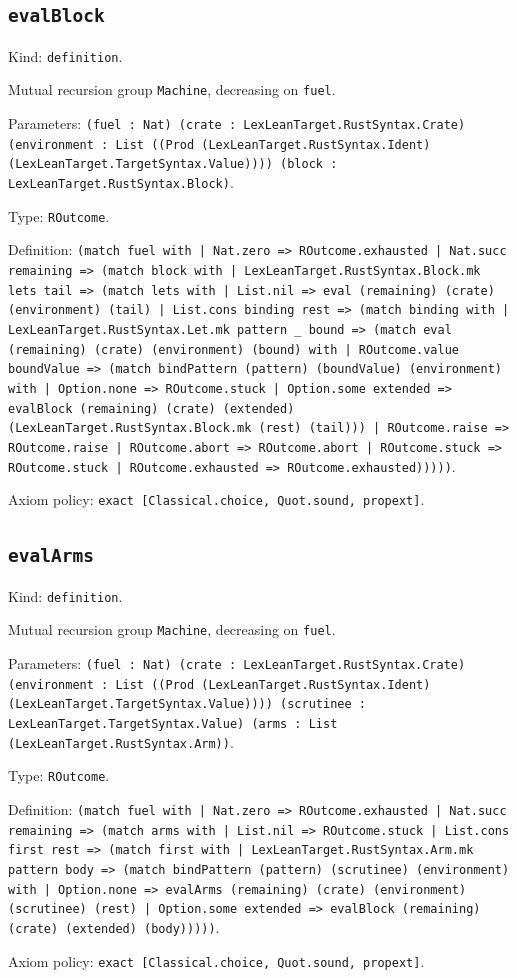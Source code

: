 \documentclass[11pt]{article}
\begin{document}
\subsection*{\texttt{evalBlock}}
\noindent Kind: \texttt{definition}.\par
\noindent Mutual recursion group \texttt{Machine}, decreasing on \texttt{fuel}.\par
\noindent Parameters: \texttt{(fuel : Nat) (crate : LexLeanTarget.RustSyntax.Crate) (environment : List ((Prod (LexLeanTarget.RustSyntax.Ident) (LexLeanTarget.TargetSyntax.Value)))) (block : LexLeanTarget.RustSyntax.Block)}.\par
\noindent Type: \texttt{ROutcome}.\par
\noindent Definition: \texttt{(match fuel with | Nat.zero => ROutcome.exhausted | Nat.succ remaining => (match block with | LexLeanTarget.RustSyntax.Block.mk lets tail => (match lets with | List.nil => eval (remaining) (crate) (environment) (tail) | List.cons binding rest => (match binding with | LexLeanTarget.RustSyntax.Let.mk pattern \_ bound => (match eval (remaining) (crate) (environment) (bound) with | ROutcome.value boundValue => (match bindPattern (pattern) (boundValue) (environment) with | Option.none => ROutcome.stuck | Option.some extended => evalBlock (remaining) (crate) (extended) (LexLeanTarget.RustSyntax.Block.mk (rest) (tail))) | ROutcome.raise => ROutcome.raise | ROutcome.abort => ROutcome.abort | ROutcome.stuck => ROutcome.stuck | ROutcome.exhausted => ROutcome.exhausted)))))}.\par
\noindent Axiom policy: \texttt{exact [Classical.choice, Quot.sound, propext]}.\par
\subsection*{\texttt{evalArms}}
\noindent Kind: \texttt{definition}.\par
\noindent Mutual recursion group \texttt{Machine}, decreasing on \texttt{fuel}.\par
\noindent Parameters: \texttt{(fuel : Nat) (crate : LexLeanTarget.RustSyntax.Crate) (environment : List ((Prod (LexLeanTarget.RustSyntax.Ident) (LexLeanTarget.TargetSyntax.Value)))) (scrutinee : LexLeanTarget.TargetSyntax.Value) (arms : List (LexLeanTarget.RustSyntax.Arm))}.\par
\noindent Type: \texttt{ROutcome}.\par
\noindent Definition: \texttt{(match fuel with | Nat.zero => ROutcome.exhausted | Nat.succ remaining => (match arms with | List.nil => ROutcome.stuck | List.cons first rest => (match first with | LexLeanTarget.RustSyntax.Arm.mk pattern body => (match bindPattern (pattern) (scrutinee) (environment) with | Option.none => evalArms (remaining) (crate) (environment) (scrutinee) (rest) | Option.some extended => evalBlock (remaining) (crate) (extended) (body)))))}.\par
\noindent Axiom policy: \texttt{exact [Classical.choice, Quot.sound, propext]}.\par
\end{document}

